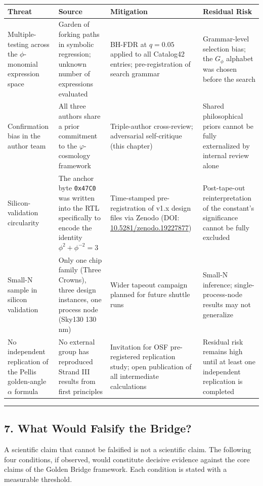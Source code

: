 \begin{tabular}{|l|l|l|l|}
\hline
Threat & Source & Mitigation & Residual Risk \\
\hline
Multiple-testing across the $\phi$-monomial expression space & Garden of forking paths in symbolic regression; unknown number of expressions evaluated & BH-FDR at $q = 0.05$ applied to all Catalog42 entries; pre-registration of search grammar & Grammar-level selection bias; the $G_\phi$ alphabet was chosen before the search \\
Confirmation bias in the author team & All three authors share a prior commitment to the $\varphi$-cosmology framework & Triple-author cross-review; adversarial self-critique (this chapter) & Shared philosophical priors cannot be fully externalized by internal review alone \\
Silicon-validation circularity & The anchor byte \texttt{0x47C0} was written into the RTL specifically to encode the identity $\phi^2 + \phi^{-2} = 3$ & Time-stamped pre-registration of v1.x design files via Zenodo (DOI: \href{https://doi.org/10.5281/zenodo.19227877}{10.5281/zenodo.19227877}) & Post-tape-out reinterpretation of the constant's significance cannot be fully excluded \\
Small-N sample in silicon validation & Only one chip family (Three Crowns), three design instances, one process node (Sky130 130 nm) & Wider tapeout campaign planned for future shuttle runs & Small-N inference; single-process-node results may not generalize \\
No independent replication of the Pellis golden-angle $\alpha$ formula & No external group has reproduced Strand III results from first principles & Invitation for OSF pre-registered replication study; open publication of all intermediate calculations & Residual risk remains high until at least one independent replication is completed \\
\hline
\end{tabular}
\noindent\rule{\textwidth}{0.4pt}

\subsection{7. What Would Falsify the Bridge?}

A scientific claim that cannot be falsified is not a scientific claim. The following four conditions, if observed, would constitute decisive evidence against the core claims of the Golden Bridge framework. Each condition is stated with a measurable threshold.

